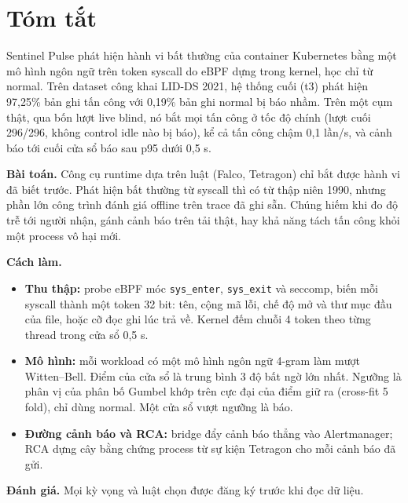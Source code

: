 \chapter*{Tóm tắt}

Sentinel Pulse phát hiện hành vi bất thường của container Kubernetes bằng một mô hình ngôn ngữ trên token syscall do eBPF dựng trong kernel, học chỉ từ normal. Trên dataset công khai LID-DS 2021, hệ thống cuối (t3) phát hiện 97,25\% bản ghi tấn công với 0,19\% bản ghi normal bị báo nhầm. Trên một cụm thật, qua bốn lượt live blind, nó bắt mọi tấn công ở tốc độ chính (lượt cuối 296/296, không control idle nào bị báo), kể cả tấn công chậm 0,1 lần/s, và cảnh báo tới cuối cửa sổ báo sau p95 dưới 0,5 s.

\textbf{Bài toán.} Công cụ runtime dựa trên luật (Falco, Tetragon) chỉ bắt được hành vi đã biết trước. Phát hiện bất thường từ syscall thì có từ thập niên 1990, nhưng phần lớn công trình đánh giá offline trên trace đã ghi sẵn. Chúng hiếm khi đo độ trễ tới người nhận, gánh cảnh báo trên tải thật, hay khả năng tách tấn công khỏi một process vô hại mới.

\textbf{Cách làm.}

\begin{itemize}
\tightlist
\item
  \textbf{Thu thập:} probe eBPF móc \texttt{sys\_\allowbreak{}enter}, \texttt{sys\_\allowbreak{}exit} và seccomp, biến mỗi syscall thành một token 32 bit: tên, cộng mã lỗi, chế độ mở và thư mục đầu của file, hoặc cỡ đọc ghi lúc trả về. Kernel đếm chuỗi 4 token theo từng thread trong cửa sổ 0,5 s.
\item
  \textbf{Mô hình:} mỗi workload có một mô hình ngôn ngữ 4-gram làm mượt Witten--Bell. Điểm của cửa sổ là trung bình 3 độ bất ngờ lớn nhất. Ngưỡng là phân vị của phân bố Gumbel khớp trên cực đại của điểm giữ ra (cross-fit 5 fold), chỉ dùng normal. Một cửa sổ vượt ngưỡng là báo.
\item
  \textbf{Đường cảnh báo và RCA:} bridge đẩy cảnh báo thẳng vào Alertmanager; RCA dựng cây bằng chứng process từ sự kiện Tetragon cho mỗi cảnh báo đã gửi.
\end{itemize}

\textbf{Đánh giá.} Mọi kỳ vọng và luật chọn được đăng ký trước khi đọc dữ liệu.


